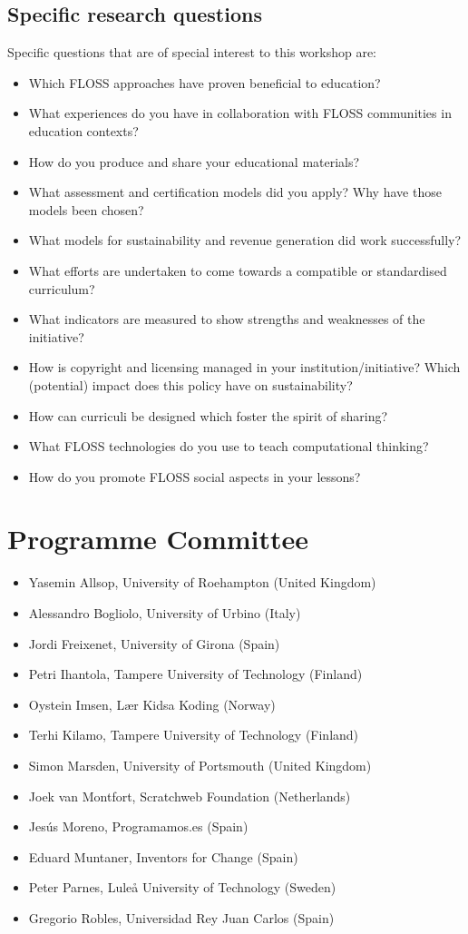 \documentclass[ifip]{svmult}
\begin{document}
\subsection*{Specific research questions}
Specific questions that are of special interest to this workshop are: 
\begin{itemize}
 \item Which FLOSS approaches have proven beneficial to education?
 \item What experiences do you have in collaboration with FLOSS communities in education contexts?
 \item How do you produce and share your educational materials? 
 \item What assessment and certification models did you apply? Why have those models been chosen? 
 \item What models for sustainability and revenue generation did work successfully? 
 \item What efforts are undertaken to come towards a compatible or standardised curriculum? 
 \item What indicators are measured to show strengths and weaknesses of the initiative? 
 \item How is copyright and licensing managed in your institution/initiative? Which (potential) impact does this policy have on sustainability? 
 \item How can curriculi be designed which foster the spirit of sharing? 
 \item What FLOSS technologies do you use to teach computational thinking?
 \item How do you promote FLOSS social aspects in your lessons?
\end{itemize}
\section*{Programme Committee}
\begin{itemize}
	\item Yasemin Allsop, University of Roehampton (United Kingdom)
	\item Alessandro Bogliolo, University of Urbino (Italy)
	\item Jordi Freixenet, University of Girona (Spain)
	\item Petri Ihantola, Tampere University of Technology (Finland)
	\item Oystein Imsen, Lær Kidsa Koding (Norway)
	\item Terhi Kilamo, Tampere University of Technology (Finland)
	\item Simon Marsden, University of Portsmouth (United Kingdom)
	\item Joek van Montfort, Scratchweb Foundation (Netherlands)
	\item Jesús Moreno, Programamos.es (Spain)
	\item Eduard Muntaner, Inventors for Change (Spain)
	\item Peter Parnes, Luleå University of Technology (Sweden)
	\item Gregorio Robles, Universidad Rey Juan Carlos (Spain)
\end{itemize}
\end{document}
